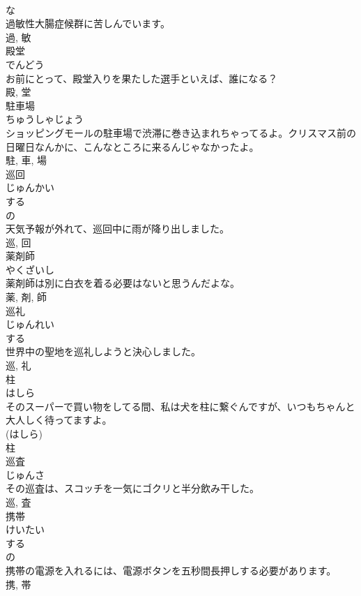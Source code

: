 \documentclass[8pt]{extreport}
\begin{document}
\begin{CJK}{UTF8}{min}
\\	な 
\\	過敏性大腸症候群に苦しんでいます。	
\\	過, 敏	
\\	殿堂	
\\	でんどう	
\\	お前にとって、殿堂入りを果たした選手といえば、誰になる？	
\\	殿, 堂	
\\	駐車場	
\\	ちゅうしゃじょう	
\\	ショッピングモールの駐車場で渋滞に巻き込まれちゃってるよ。クリスマス前の日曜日なんかに、こんなところに来るんじゃなかったよ。	
\\	駐, 車, 場	
\\	巡回	
\\	じゅんかい	
\\	する 
\\	の 
\\	天気予報が外れて、巡回中に雨が降り出しました。	
\\	巡, 回	
\\	薬剤師	
\\	やくざいし	
\\	薬剤師は別に白衣を着る必要はないと思うんだよな。	
\\	薬, 剤, 師	
\\	巡礼	
\\	じゅんれい	
\\	する 
\\	世界中の聖地を巡礼しようと決心しました。	
\\	巡, 礼	
\\	柱	
\\	はしら	
\\	そのスーパーで買い物をしてる間、私は犬を柱に繋ぐんですが、いつもちゃんと大人しく待ってますよ。	
\\	(はしら) 
\\	柱	
\\	巡査	
\\	じゅんさ	
\\	その巡査は、スコッチを一気にゴクリと半分飲み干した。	
\\	巡, 査	
\\	携帯	
\\	けいたい	
\\	する 
\\	の 
\\	携帯の電源を入れるには、電源ボタンを五秒間長押しする必要があります。	
\\	携, 帯	

\end{CJK}
\end{document}
